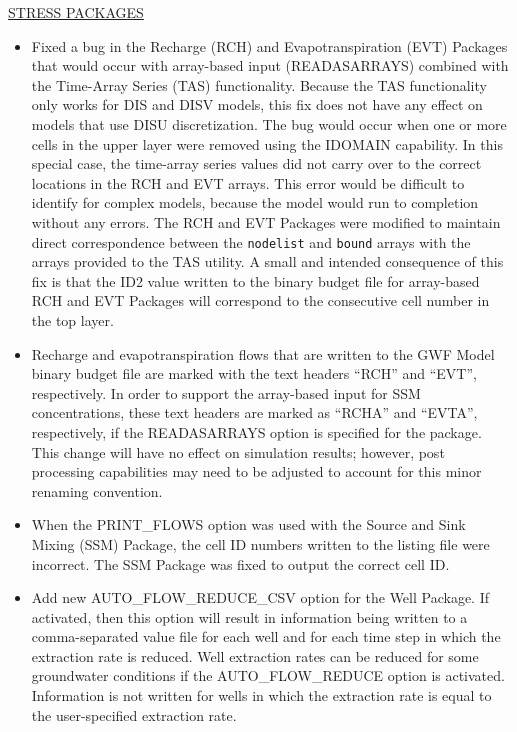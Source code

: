 	\underline{STRESS PACKAGES}
	\begin{itemize}
	        \item Fixed a bug in the Recharge (RCH) and Evapotranspiration (EVT) Packages that would occur with array-based input (READASARRAYS) combined with the Time-Array Series (TAS) functionality.  Because the TAS functionality only works for DIS and DISV models, this fix does not have any effect on models that use DISU discretization.  The bug would occur when one or more cells in the upper layer were removed using the IDOMAIN capability.  In this special case, the time-array series values did not carry over to the correct locations in the RCH and EVT arrays.  This error would be difficult to identify for complex models, because the model would run to completion without any errors.  The RCH and EVT Packages were modified to maintain direct correspondence between the \texttt{nodelist} and \texttt{bound} arrays with the arrays provided to the TAS utility.  A small and intended consequence of this fix is that the ID2 value written to the binary budget file for array-based RCH and EVT Packages will correspond to the consecutive cell number in the top layer.  
	        \item Recharge and evapotranspiration flows that are written to the GWF Model binary budget file are marked with the text headers ``RCH'' and ``EVT'', respectively.  In order to support the array-based input for SSM concentrations, these text headers are marked as ``RCHA'' and ``EVTA'', respectively, if the READASARRAYS option is specified for the package.  This change will have no effect on simulation results; however, post processing capabilities may need to be adjusted to account for this minor renaming convention.
	        \item When the PRINT\_FLOWS option was used with the Source and Sink Mixing (SSM) Package, the cell ID numbers written to the listing file were incorrect.  The SSM Package was fixed to output the correct cell ID.
	        \item Add new AUTO\_FLOW\_REDUCE\_CSV option for the Well Package.  If activated, then this option will result in information being written to a comma-separated value file for each well and for each time step in which the extraction rate is reduced.  Well extraction rates can be reduced for some groundwater conditions if the AUTO\_FLOW\_REDUCE option is activated.  Information is not written for wells in which the extraction rate is equal to the user-specified extraction rate.
	\end{itemize}

